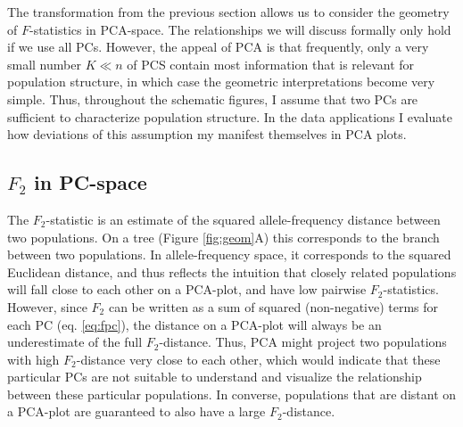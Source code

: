 \documentclass[12pt,fullpage, a4paper]{article}
\begin{document}
The transformation from the previous section allows us to consider the geometry of $F$-statistics in PCA-space. The relationships we will discuss formally only hold if we use all PCs. However, the appeal of PCA is that frequently, only a very small number $K \ll n$ of PCS contain most information that is
relevant for population structure, in which case the geometric interpretations become very simple. Thus, throughout the schematic figures, I assume that two PCs are sufficient to characterize population structure. In the data applications I evaluate how deviations of this assumption my manifest themselves in PCA plots.

\subsection{$F_2$ in PC-space}
The $F_2$-statistic is an estimate of the squared allele-frequency distance between two
populations. On a tree (Figure \ref{fig:geom}A) this corresponds to the branch between two populations. In allele-frequency space, it corresponds to the squared Euclidean distance, and thus reflects the intuition that closely related populations  will fall close to each other on a PCA-plot, and have low pairwise $F_2$-statistics. However, since $F_2$ can be written as  a sum of squared (non-negative) terms for each PC (eq. \ref{eq:fpc}), the distance on a PCA-plot will always be an underestimate of the full $F_2$-distance. Thus, PCA might project two populations with high $F_2$-distance very close to each other, which would indicate that these particular PCs are not suitable to  understand and visualize the relationship between these particular populations. In converse, populations that are distant on a PCA-plot are guaranteed to also have a large $F_2$-distance.
\end{document}
